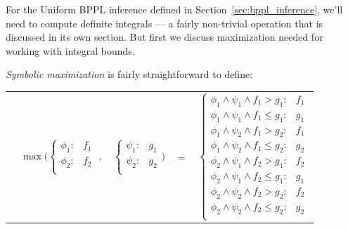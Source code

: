 \documentclass[letterpaper]{article}
\begin{document}
For the Uniform BPPL inference defined in
Section~\ref{sec:bppl_inference}, we'll need to compute definite
integrals --- a fairly non-trivial operation that is discussed in its
own section.  But first we discuss maximization needed for working
with integral bounds.

\emph{Symbolic maximization} is fairly straightforward
to define:

{\footnotesize
\begin{center}
\begin{tabular}{r c c c l}
&
\hspace{-9mm} $\max \Bigg(
  \begin{cases}
    \phi_1: & f_1 \\ 
    \phi_2: & f_2 \\ 
  \end{cases}$
$,$
&
\hspace{-4mm}
  $\begin{cases}
    \psi_1: & g_1 \\ 
    \psi_2: & g_2 \\ 
  \end{cases} \Bigg)$
&
\hspace{-4mm} 
$ = $
&
\hspace{-4mm}
  $\begin{cases}
  \phi_1 \wedge \psi_1 \wedge f_1 > g_1    : & f_1 \\ 
  \phi_1 \wedge \psi_1 \wedge f_1 \leq g_1 : & g_1 \\ 
  \phi_1 \wedge \psi_2 \wedge f_1 > g_2    : & f_1 \\ 
  \phi_1 \wedge \psi_2 \wedge f_1 \leq g_2 : & g_2 \\ 
  \phi_2 \wedge \psi_1 \wedge f_2 > g_1    : & f_2 \\ 
  \phi_2 \wedge \psi_1 \wedge f_2 \leq g_1 : & g_1 \\ 
  \phi_2 \wedge \psi_2 \wedge f_2 > g_2    : & f_2 \\ 
  \phi_2 \wedge \psi_2 \wedge f_2 \leq g_2 : & g_2 \\ 
  \end{cases}$
\end{tabular}
\end{center}
}
\end{document}
